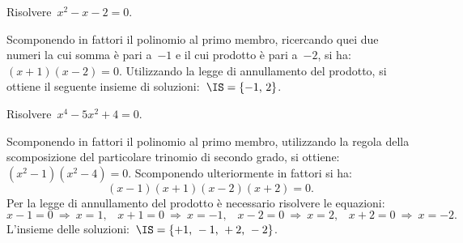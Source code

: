 \begin{exrig}
 \begin{esempio}
Risolvere~$x^{2}-x-2=0$.

Scomponendo in fattori il polinomio al primo membro, ricercando quei due numeri la cui somma è pari a~$-1$ e il cui prodotto è pari a~$-2$, 
si ha:~$(x+1)(x-2)=0$.
Utilizzando la legge di annullamento del prodotto, si ottiene il seguente insieme di soluzioni:~$\IS=\{-1\text{,~}2\}$.
 \end{esempio}

 \begin{esempio}
Risolvere~$x^{4}-5x^{2}+4=0$.

Scomponendo in fattori il polinomio al primo membro, utilizzando la regola della scomposizione del particolare trinomio di secondo grado,
si ottiene:~$(x^{2}-1)(x^{2}-4)=0$. Scomponendo ulteriormente in fattori si ha:
\begin{equation*}
(x-1)(x+1)(x-2)(x+2)=0.
\end{equation*}
Per la legge di annullamento del prodotto è necessario risolvere le equazioni:
\begin{equation*}
x-1=0\: \Rightarrow\: x=1\text{,}\quad x+1=0\: \Rightarrow\: x=-1\text{,}\quad x-2=0\: \Rightarrow\: x=2\text{,}\quad x+2=0\: \Rightarrow\: x=-2.
\end{equation*}
L'insieme delle soluzioni:~$\IS=\{+1\text{,~}-1\text{,~}+2\text{,~}-2\}$.
 \end{esempio}

\end{exrig}

\ovalbox{\risolvii \ref{ese:17.1}, \ref{ese:17.2}, \ref{ese:17.3}, \ref{ese:17.4}, \ref{ese:17.5}, \ref{ese:17.6}, \ref{ese:17.7}, \ref{ese:17.8},
\ref{ese:17.9}, \ref{ese:17.10}}

\vspazio\ovalbox{\ref{ese:17.11}, \ref{ese:17.12}, \ref{ese:17.13}}

\newpage

\cleardoublepage
